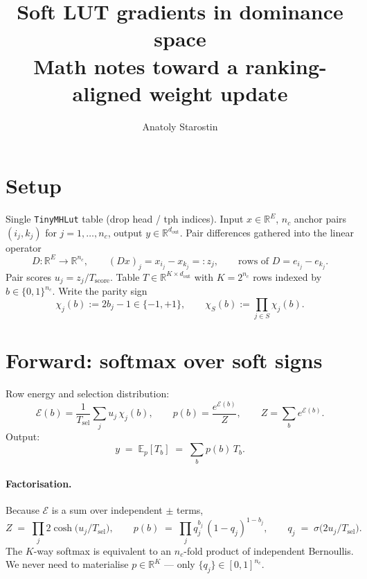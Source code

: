 \documentclass[11pt]{article}
\newcommand{\R}{\mathbb{R}}
\newcommand{\E}{\mathbb{E}}
\newcommand{\Tsel}{T_{\mathrm{sel}}}
\newcommand{\Tscore}{T_{\mathrm{score}}}
\newcommand{\dout}{d_{\mathrm{out}}}
\begin{document}
\title{\Large\textbf{Soft LUT gradients in dominance space}\\[2pt]
\large Math notes toward a ranking-aligned weight update}
\author{Anatoly Starostin}
\date{}
\maketitle
\vspace{-14pt}

\section{Setup}
\label{sec:setup}

Single \texttt{TinyMHLut} table (drop head / tph indices). Input $x \in \R^E$, $n_c$ anchor pairs $(i_j, k_j)$ for $j = 1, \dots, n_c$, output $y \in \R^{\dout}$. Pair differences gathered into the linear operator
\[
D : \R^E \to \R^{n_c}, \qquad (Dx)_j = x_{i_j} - x_{k_j} =: z_j, \qquad \text{rows of } D = e_{i_j} - e_{k_j}.
\]
Pair scores $u_j = z_j / \Tscore$. Table $T \in \R^{K \times \dout}$ with $K = 2^{n_c}$ rows indexed by $b \in \{0,1\}^{n_c}$. Write the parity sign
\[
\chi_j(b) := 2 b_j - 1 \in \{-1, +1\}, \qquad \chi_S(b) := \prod_{j \in S} \chi_j(b).
\]

\section{Forward: softmax over soft signs}
\label{sec:fwd}

Row energy and selection distribution:
\[
\mathcal{E}(b) = \frac{1}{\Tsel} \sum_j u_j\, \chi_j(b), \qquad
p(b) = \frac{e^{\mathcal{E}(b)}}{Z}, \qquad
Z = \sum_b e^{\mathcal{E}(b)}.
\]
Output:
\[
y \;=\; \E_p\!\left[T_b\right] \;=\; \sum_b p(b)\, T_b.
\]

\paragraph{Factorisation.} Because $\mathcal{E}$ is a sum over independent $\pm$ terms,
\[
Z \;=\; \prod_j 2 \cosh\!\big(u_j/\Tsel\big), \qquad
p(b) \;=\; \prod_j q_j^{b_j}\,(1 - q_j)^{1-b_j}, \qquad
q_j \;=\; \sigma\!\big(2 u_j / \Tsel\big).
\]
The $K$-way softmax is equivalent to an $n_c$-fold product of independent Bernoullis. We never need to materialise $p \in \R^K$ — only $\{q_j\} \in [0,1]^{n_c}$.
\end{document}
